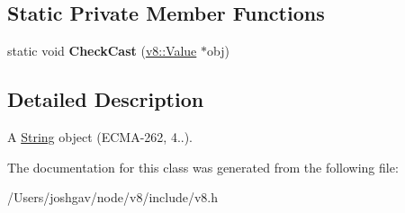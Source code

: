 \subsection*{Static Private Member Functions}
\begin{DoxyCompactItemize}
\item 
static void {\bfseries Check\+Cast} (\hyperlink{classv8_1_1_value}{v8\+::\+Value} $\ast$obj)\hypertarget{classv8_1_1_string_object_ada6a0b8ce6681cedc8946c8eb8163d63}{}\label{classv8_1_1_string_object_ada6a0b8ce6681cedc8946c8eb8163d63}

\end{DoxyCompactItemize}


\subsection{Detailed Description}
A \hyperlink{classv8_1_1_string}{String} object (E\+C\+M\+A-\/262, 4..). 

The documentation for this class was generated from the following file\+:\begin{DoxyCompactItemize}
\item 
/\+Users/joshgav/node/v8/include/v8.\+h\end{DoxyCompactItemize}
